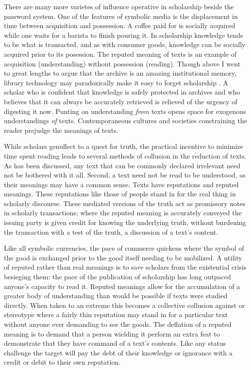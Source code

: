 \documentclass[]{book}
\theoremstyle{definition}
\theoremstyle{definition}
\theoremstyle{definition}
\theoremstyle{remark}
\begin{document}
There are many more varietes of influence operative in scholarship
beside the password system. One of the features of symbolic media is the
displacement in time between acquisition and possession. A coffee paid
for is socially acquired while one waits for a barista to finish pouring
it. In scholarship knowledge tends to be what is transacted, and as with
consumer goods, knowledge can be socially acquired prior to its
posession. The reputed meaning of texts is an example of acquisition
(understanding) without possession (reading). Though above I went to
great lengths to argue that the archive is an amazing institutional
memory, library technology may paradoxically make it easy to forget
scholarship \citep{Cevolini2016Forgetting}. A scholar who is confident
that knowledge is safely protected in archives and who believes that it
can always be accurately retrieved is relieved of the urgency of
digesting it now. Punting on understanding \emph{from} texts opens space
for exogenous understandings \emph{of} texts. Contemporaneous cultures
and societies constraining the reader prejudge the meanings of texts.

While scholars genuflect to a quest for truth, the practical incentive
to minimize time spent reading leads to several methods of collusion in
the reduction of texts. As has been discussed, any text that can be
commonly declared irrelevant need not be bothered with it all. Second, a
text need not be read to be understood, as their meanings may have a
common sense. Texts have reputations and reputed meanings. These
reputations like those of people stand in for the real thing in
scholarly discourse. These mediated versions of the truth act as
promissory notes in scholarly transactions; where the reputed meaning is
accurately conveyed the issuing party is given credit for knowing the
underlying truth, without burdening the transaction with a test of the
truth, a discussion of a text's content.

Like all symbolic currencies, the pace of commerce quickens where the
symbol of the good is exchanged prior to the good itself needing to be
mobilized. A utility of reputed rather than real meanings is to save
scholars from the existential crisis besieging them: the pace of the
publication of scholarship has long outpaced anyone's capacity to read
it. Reputed meanings allow for the accumulation of a greater body of
understanding than would be possible if texts were studied directly.
When taken to an extreme this becomes a collective collusion against or
stereotype where a fairly thin reputation may stand in for a particular
text without anyone ever demanding to see the goods. The deflation of a
reputed meaning is to demand that a person wielding it perform an extra
feat to demonstrate that they have command of a text's contents. Like
any status challenge the target will pay the debt of their knowledge or
ignorance with a credit or debit to their own reputation.
\end{document}
